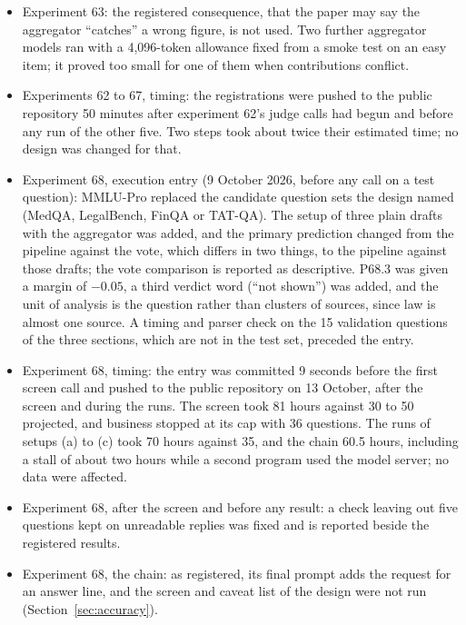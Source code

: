 \documentclass[10pt,twocolumn]{article}
\begin{document}
\begin{itemize}
committed three days before the experiment ran and was not carried into
it. First scoring: check fails at $44/61$. Second: passes at $46/61$.
The statistics of the three predictions are the same in both.
\item Experiment 63: the registered consequence, that the paper may say
the aggregator ``catches'' a wrong figure, is not used. Two further
aggregator models ran with a 4{,}096-token allowance fixed from a smoke
test on an easy item; it proved too small for one of them when
contributions conflict.
\item Experiments 62 to 67, timing: the registrations were pushed to
the public repository 50 minutes after experiment 62's judge calls had
begun and before any run of the other five. Two steps took about twice
their estimated time; no design was changed for that.
\item Experiment 68, execution entry (9 October 2026, before any call on
a test question): MMLU-Pro replaced the candidate question sets the
design named (MedQA, LegalBench, FinQA or TAT-QA). The setup of three
plain drafts with the aggregator was added, and the primary prediction
changed from the pipeline against the vote, which differs in two
things, to the pipeline against those drafts; the vote comparison is
reported as descriptive. P68.3 was given a margin of $-0.05$, a third
verdict word (``not shown'') was added, and the unit of analysis is the
question rather than clusters of sources, since law is almost one
source. A timing and parser check on the 15 validation questions of the
three sections, which are not in the test set, preceded the entry.
\item Experiment 68, timing: the entry was committed 9 seconds before
the first screen call and pushed to the public repository on 13
October, after the screen and during the runs. The screen took 81 hours
against 30 to 50 projected, and business stopped at its cap with 36
questions. The runs of setups (a) to (c) took 70 hours against 35, and
the chain 60.5 hours, including a stall of about two hours while a
second program used the model server; no data were affected.
\item Experiment 68, after the screen and before any result: a check
leaving out five questions kept on unreadable replies was fixed and is
reported beside the registered results.
\item Experiment 68, the chain: as registered, its final prompt adds the
request for an answer line, and the screen and caveat list of the
design were not run (Section~\ref{sec:accuracy}).
\end{itemize}
\end{document}

